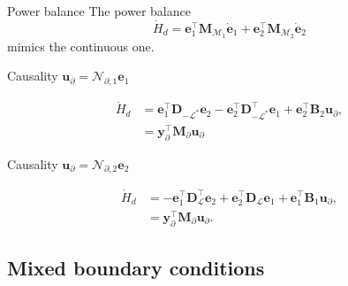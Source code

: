 \documentclass[aspectratio=169]{ISAE-Beamer}
\begin{document}
\begin{frame}{Power balance}
	The power balance 
	\begin{equation*}
		\dot{H}_d = \mathbf{e}_1^\top \mathbf{M}_{\mathcal{M}_1} \dot{\mathbf{e}}_{1} + \mathbf{e}_2^\top \mathbf{M}_{\mathcal{M}_2} \dot{\mathbf{e}}_{2} 
	\end{equation*}
	mimics the continuous one.
	
	\begin{exampleblock}{Causality $\bm{u}_\partial = \mathcal{N}_{\partial, 1} \displaystyle \bm{e}_1$}
		
		\begin{equation*}
			\begin{aligned}
				\dot{H}_d &= \mathbf{e}_{1}^\top \mathbf{D}_{-\mathcal{L}^*} \mathbf{e}_{2} - \mathbf{e}_{2}^\top \mathbf{D}_{-\mathcal{L}^*}^\top \mathbf{e}_{1} + \mathbf{e}_{2}^\top \mathbf{B}_2 \mathbf{u}_\partial, \\
				& = \mathbf{y}_\partial^\top \mathbf{M}_\partial \mathbf{u}_\partial
			\end{aligned}
		\end{equation*}
		
	\end{exampleblock}
	
	\begin{exampleblock}{Causality $\bm{u}_\partial = \mathcal{N}_{\partial, 2} \displaystyle \bm{e}_2$}
		
		\begin{equation*}
			\begin{aligned}
				\dot{H}_d 	&= - \mathbf{e}_{1}^\top \mathbf{D}_{\mathcal{L}}^\top \mathbf{e}_{2} + \mathbf{e}_{2}^\top \mathbf{D}_{\mathcal{L}} \mathbf{e}_{1} + \mathbf{e}_{1}^\top \mathbf{B}_1 \mathbf{u}_\partial, \\
				& = \mathbf{y}_\partial^\top \mathbf{M}_\partial \mathbf{u}_\partial.
			\end{aligned}
		\end{equation*}
		
	\end{exampleblock}
\end{frame}


\subsection{Mixed boundary conditions}
\end{document}
